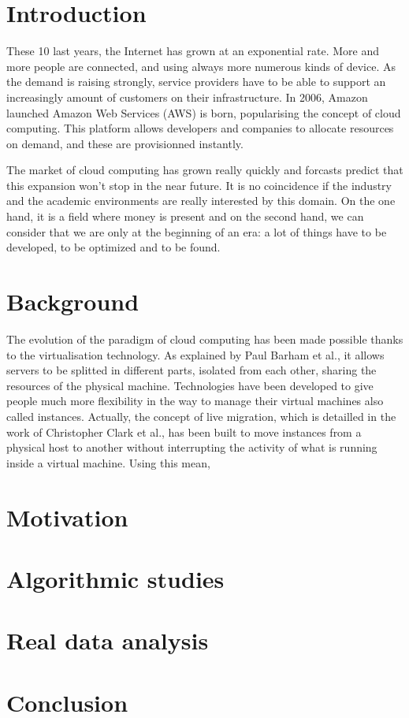 \documentclass[a4paper,11pt]{report}
\begin{document}
\section*{Introduction}

These 10 last years, the Internet has grown at an exponential rate. More and
more people are connected, and using always more numerous kinds of device.
As the demand is raising strongly, service providers have to be able to support
an increasingly amount of customers on their infrastructure. In 2006, Amazon
launched Amazon Web Services (AWS) is born, popularising the concept of cloud
computing. This platform allows developers and companies to allocate resources
on demand, and these are provisionned instantly.

The market of cloud computing has grown really quickly and forcasts predict that
this expansion won't stop in the near future.\cite{website:cloudcomputingmarket}
It is no coincidence if the industry and the academic environments are really
interested by this domain. On the one hand, it is a field where money is present
and on the second hand, we can consider that we are only at the beginning of an
era: a lot of things have to be developed, to be optimized and to be found.

\section{Background}

The evolution of the paradigm of cloud computing has been made possible thanks
to the virtualisation technology. As explained by Paul Barham et al.\cite{virtualisation},
it allows servers to be splitted in different parts, isolated from each other,
sharing the resources of the physical machine. Technologies have been developed to
give people much more flexibility in the way to manage their virtual machines also called
instances. Actually, the concept of live migration, which is detailled in the work
of Christopher Clark et al.\cite{livemigration}, has been built to move instances
from a physical host to another without interrupting the activity of what is running
inside a virtual machine. Using this mean, 


\section{Motivation}
\section{Algorithmic studies}
\section{Real data analysis}

\section*{Conclusion}

\nocite{*}


\end{document}

